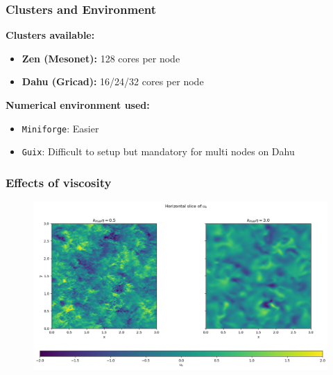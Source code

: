 \documentclass{beamer}
\begin{document}
\begin{frame}
\frametitle{Clusters and Environment}

\textbf{Clusters available:}
\begin{itemize}
	\item \textbf{Zen (Mesonet):}  128 cores  per node
	\item \textbf{Dahu (Gricad):} 16/24/32 cores per node
\end{itemize}

\textbf{Numerical environment used:}
\begin{itemize}
	\item \texttt{Miniforge}: Easier
	\item \texttt{Guix}: Difficult to setup but mandatory for multi nodes on Dahu
\end{itemize}

\end{frame}


\begin{frame}
\frametitle{Effects of viscosity}

\begin{figure}
    \centering
    \includegraphics[height=0.65\textheight]{fig/hori_slice.png}
\end{figure}

\end{frame}
\end{document}
